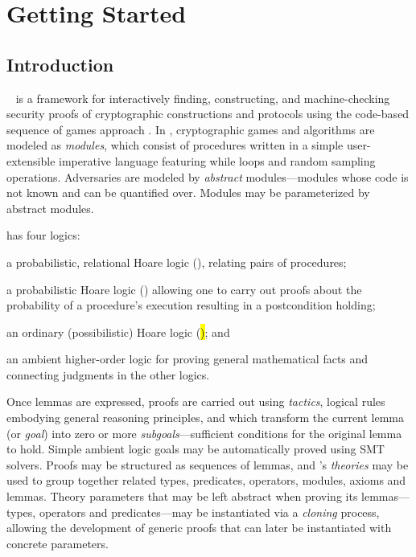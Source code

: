 \chapter{Getting Started}

\section{Introduction}

\EasyCrypt~\cite{barthe-easycrypt-intro-2014,barthe-crypto-2011} is a
framework for interactively finding, constructing, and
machine-checking security proofs of cryptographic constructions and
protocols using the code-based sequence of games approach
\cite{bellare-rogaway-code-based-2004,%
  bellare-rogaway-triple-enc-2006,shoup-seq-games-2004}. In
\EasyCrypt, cryptographic games and algorithms are modeled as
\emph{modules}, which consist of procedures written in a simple
user-extensible imperative language featuring while loops and random
sampling operations. Adversaries are modeled by \emph{abstract}
modules---modules whose code is not known and can be quantified
over. Modules may be parameterized by abstract modules.

\EasyCrypt has four logics:
\begin{inparaitem}[]
\item a probabilistic, relational Hoare logic (\prhl), relating pairs
  of procedures;
\item a probabilistic Hoare logic (\phl) allowing one to carry out
  proofs about the probability of a procedure's execution resulting in
  a postcondition holding;
\item an ordinary (possibilistic) Hoare logic (\hl); and
\item an ambient higher-order logic for proving general mathematical
  facts and connecting judgments in the other logics.
\end{inparaitem}
Once lemmas are expressed, proofs are carried out using
\emph{tactics}, logical rules embodying general reasoning principles,
and which transform the current lemma (or \emph{goal}) into zero or
more \emph{subgoals}---sufficient conditions for the original lemma to
hold. Simple ambient logic goals may be automatically proved using SMT
solvers. Proofs may be structured as sequences of lemmas, and
\EasyCrypt's \emph{theories} may be used to group together related
types, predicates, operators, modules, axioms and lemmas. Theory
parameters that may be left abstract when proving its lemmas---types,
operators and predicates---may be instantiated via a \emph{cloning}
process, allowing the development of generic proofs that can later be
instantiated with concrete parameters.

